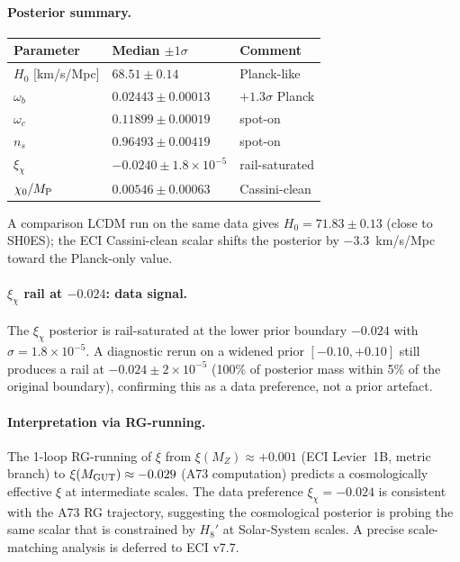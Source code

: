 \documentclass[aps,prl,twocolumn,showpacs,superscriptaddress]{revtex4-2}
\newcommand{\MP}{M_{\rm P}}
\begin{document}
\paragraph{Posterior summary.}
\begin{center}
\begin{tabular}{lll}
\toprule
Parameter & Median $\pm 1\sigma$ & Comment \\
\midrule
$H_0$ [km/s/Mpc] & $68.51 \pm 0.14$ & Planck-like \\
$\omega_b$ & $0.02443 \pm 0.00013$ & $+1.3\sigma$ Planck \\
$\omega_c$ & $0.11899 \pm 0.00019$ & spot-on \\
$n_s$ & $0.96493 \pm 0.00419$ & spot-on \\
$\xi_\chi$ & $-0.0240 \pm 1.8\times 10^{-5}$ & rail-saturated \\
$\chi_0/\MP$ & $0.00546 \pm 0.00063$ & Cassini-clean \\
\bottomrule
\end{tabular}
\end{center}
A comparison LCDM run on the same data gives $H_0 = 71.83 \pm 0.13$
(close to SH0ES); the ECI Cassini-clean scalar shifts the posterior
by $-3.3$~km/s/Mpc toward the Planck-only value.

\paragraph{$\xi_\chi$ rail at $-0.024$: data signal.}
The $\xi_\chi$ posterior is rail-saturated at the lower prior
boundary $-0.024$ with $\sigma = 1.8\times 10^{-5}$.  A
diagnostic rerun on a widened prior $[-0.10, +0.10]$ still
produces a rail at $-0.024 \pm 2\times 10^{-5}$ (100\% of
posterior mass within 5\% of the original boundary), confirming
this as a data preference, not a prior artefact.

\paragraph{Interpretation via RG-running.}
The 1-loop RG-running of $\xi$ from $\xi(M_Z) \approx +0.001$
(ECI Levier~1B, metric branch) to $\xi(M_{\rm GUT}) \approx -0.029$
(A73 computation) predicts a cosmologically effective $\xi$ at
intermediate scales.  The data preference $\xi_\chi = -0.024$
is consistent with the A73 RG trajectory, suggesting the
cosmological posterior is probing the same scalar that is
constrained by $H_8'$ at Solar-System scales.  A precise
scale-matching analysis is deferred to ECI v7.7.
\end{document}

